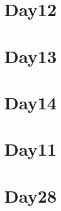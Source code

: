 
\section*{Day12}

\vfill
\section*{Day13}

\vfill
\section*{Day14}

\vfill
\section*{Day11}

\vfill
\section*{Day28}

\vfill
